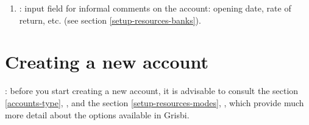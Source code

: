 \begin{enumerate}
\begin{itemize}
		\item {}: the minimum balance authorised by your financial institution, more commonly known as an overdraft facility;
		\item {}: the minimum balance you would like to maintain; for the balance colour coding on the  page to work properly, it must be greater than or equal to the minimum authorised balance;
	\end{itemize}	
	\item {}: input field for informal comments on the account: opening date, rate of return, etc. (see section \vref{setup-resources-banks}).
\end{enumerate}

\section{Creating a new account\label{accounts-new}}%


\Note{}: before you start creating a new account, it is advisable to consult the section \vref{accounts-type}, , and the section \vref{setup-resources-modes}, , which provide much more detail about the options available in Grisbi.

